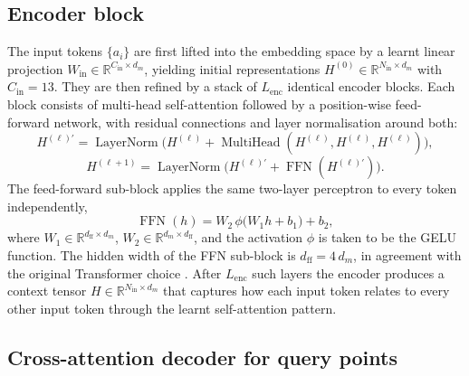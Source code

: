\subsection{Encoder block}

The input tokens \(\{a_i\}\) are first lifted into the embedding space
by a learnt linear projection
\(W_{\mathrm{in}}\in\mathbb{R}^{C_{\mathrm{in}}\times d_m}\),
yielding initial representations
\(H^{(0)}\in\mathbb{R}^{N_{\mathrm{in}}\times d_m}\) with
\(C_{\mathrm{in}}=13\). They are then refined by a stack of
\(L_{\mathrm{enc}}\) identical encoder blocks. Each block consists of
multi-head self-attention followed by a position-wise feed-forward
network, with residual connections and layer normalisation around
both:
\begin{equation}
H^{(\ell)'} =
\operatorname{LayerNorm}\!\big(
  H^{(\ell)} +
  \operatorname{MultiHead}(H^{(\ell)},H^{(\ell)},H^{(\ell)})
\big),
\end{equation}
\begin{equation}
H^{(\ell+1)} =
\operatorname{LayerNorm}\!\big(
  H^{(\ell)'} +
  \operatorname{FFN}(H^{(\ell)'})
\big).
\end{equation}
The feed-forward sub-block applies the same two-layer perceptron to
every token independently,
\begin{equation}
\operatorname{FFN}(h) =
W_2\,\phi\!\big(W_1h + b_1\big) + b_2,
\end{equation}
where \(W_1\in\mathbb{R}^{d_{\mathrm{ff}}\times d_m}\),
\(W_2\in\mathbb{R}^{d_m\times d_{\mathrm{ff}}}\), and the
activation \(\phi\) is taken to be the GELU function. The hidden width
of the FFN sub-block is \(d_{\mathrm{ff}} = 4\,d_m\), in agreement with
the original Transformer choice \cite{vaswani2017}. After
\(L_{\mathrm{enc}}\) such layers the encoder produces a context tensor
\(H\in\mathbb{R}^{N_{\mathrm{in}}\times d_m}\) that captures
how each input token relates to every other input token through the
learnt self-attention pattern.

\subsection{Cross-attention decoder for query points}

